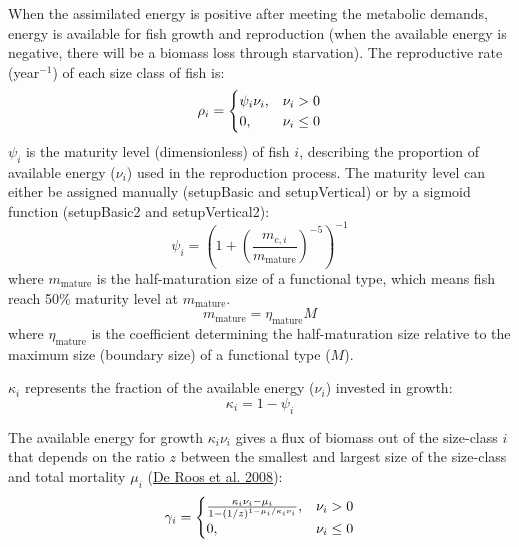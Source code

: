 \documentclass[
]{article}
\begin{document}
When the assimilated energy is positive after meeting the metabolic
demands, energy is available for fish growth and reproduction (when the
available energy is negative, there will be a biomass loss through
starvation). The reproductive rate (year\(^{-1}\)) of each size class of
fish is: \begin{equation}
\rho_i =
  \begin{cases}
 \psi_i \nu_i, & \text{$ \nu_i > 0 $}   \\
     0, & \text{$ \nu_i \leq 0 $} 
  \end{cases}
\end{equation} \(\psi_i\) is the maturity level (dimensionless) of fish
\(i\), describing the proportion of available energy (\(\nu_{i}\)) used
in the reproduction process. The maturity level can either be assigned
manually (setupBasic and setupVertical) or by a sigmoid function
(setupBasic2 and setupVertical2): \begin{equation}
\psi_i = \left(1+\left(\frac{m_{\mathrm{c},i}}{m_{\mathrm{mature}}}\right)^{-5} \right)^{-1}
\end{equation} where \(m_{\mathrm{mature}}\) is the half-maturation size
of a functional type, which means fish reach 50\% maturity level at
\(m_{\mathrm{mature}}\). \begin{equation}
m_{\mathrm{mature}} = \eta_{\mathrm{mature}} M
\end{equation} where \(\eta_{\mathrm{mature}}\) is the coefficient
determining the half-maturation size relative to the maximum size
(boundary size) of a functional type (\(M\)).

\(\kappa_{i}\) represents the fraction of the available energy
(\(\nu_{i}\)) invested in growth: \begin{equation}
\kappa_i = 1 - \psi_i
\end{equation}

The available energy for growth \(\kappa_i \nu_i\) gives a flux of
biomass out of the size-class \(i\) that depends on the ratio \(z\)
between the smallest and largest size of the size-class and total
mortality \(\mu_i\) (\protect\hyperlink{ref-deRoos2008}{De Roos et al.
2008}): \begin{equation}
 \gamma_i =
  \begin{cases}
\frac{ \kappa_i \nu_i - \mu_i }{1-(1/z)^{1-\mu_i/\kappa_i \nu_i}}, & \text{$ \nu_i > 0 $}   \\
     0, & \text{$ \nu_i \leq 0 $} 
  \end{cases}
\end{equation}
\end{document}
